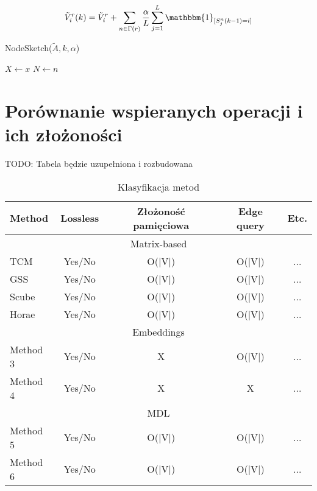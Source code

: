         \begin{equation} \label{eq:node_sketch_3}  
            \tilde{V}_{i}^{r}(k) = \tilde{V}_{i}^{r} + \sum\limits_{n \in 	\Gamma(r)} \frac{\alpha}{L} \sum\limits_{j = 1}^{L} \mathbbm{1}_{[S_{j}^{n}(k - 1) = i]}
        \end{equation}

        \begin{algorithm}
            \caption{NodeSketch($\tilde{A},k,\alpha$)}\label{alg:node_sketch}
            $X \gets x$\;
            $N \gets n$\;
        \end{algorithm}


\section{Porównanie wspieranych operacji i ich złożoności}
    TODO: Tabela będzie uzupełniona i rozbudowana

    \begin{table}[htbp]
        \centering
        \caption{Klasyfikacja metod}
        \begin{tabular}{l | c | c | c | c}
        \toprule
        \textbf{Method} & \textbf{Lossless} & \textbf{Złożoność pamięciowa} & \textbf{Edge query} & \textbf{Etc.} \\
        \midrule
        \multicolumn{5}{c}{Matrix-based} \\
        \midrule
        TCM & Yes/No & O(|V|) & O(|V|) & ... \\
        GSS & Yes/No & O(|V|) & O(|V|) & ... \\
        Scube & Yes/No & O(|V|) & O(|V|) & ... \\
        Horae & Yes/No & O(|V|) & O(|V|) & ... \\
        \midrule
        \multicolumn{5}{c}{Embeddings} \\
        \midrule
        Method 3 & Yes/No & X & O(|V|) & ... \\
        Method 4 & Yes/No & X & X & ... \\
        \midrule
        \multicolumn{5}{c}{MDL} \\
        \midrule
        Method 5 & Yes/No & O(|V|) & O(|V|) & ... \\
        Method 6 & Yes/No & O(|V|) & O(|V|) & ... \\
        \bottomrule
        \end{tabular}
    \end{table}

